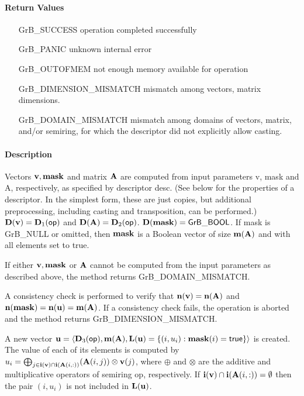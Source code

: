 \paragraph{Return Values}

\begin{itemize}[leftmargin=2.1in]
\item[{\sf GrB\_SUCCESS}]             operation completed successfully
\item[{\sf GrB\_PANIC}]               unknown internal error
\item[{\sf GrB\_OUTOFMEM}]            not enough memory available for operation
\item[{\sf GrB\_DIMENSION\_MISMATCH}] mismatch among vectors, matrix dimensions.
\item[{\sf GrB\_DOMAIN\_MISMATCH}]    mismatch among domains of vectors, matrix, and/or semiring, for which the descriptor did not explicitly allow casting.
\end{itemize}


\paragraph{Description}

Vectors ${\bf v}, {\bf mask}$ and matrix ${\bf A}$ are computed from
input parameters {\sf v}, {\sf mask} and {\sf A}, respectively, as specified
by descriptor {\sf desc}. (See below for the properties of a descriptor. In
the simplest form, these are just copies, but additional preprocessing,
including casting and transposition, can be performed.)  $\bold{D}({\bf v}) =
\bold{D}_1({\sf op})$ and $\bold{D}({\bf A}) = \bold{D}_2({\sf op})$.
$\bold{D}({\bf mask}) = {\sf GrB\_BOOL}$.  If {\sf mask} is {\sf GrB\_NULL} or omitted,
then ${\bf mask}$ is a Boolean vector of size $\bold{m}({\bf A})$
and with all elements set to {\sf true}.

If either ${\bf v}, {\bf mask}$ or ${\bf A}$ cannot be computed
from the input parameters as described above, the method returns {\sf
GrB\_DOMAIN\_MISMATCH}.

A consistency check is performed to verify that $\bold{n}({\bf v})
= \bold{n}({\bf A})$ and $\bold{n}({\bf mask}) =
\bold{n}({\bf u}) = \bold{m}({\bf A})$. If a consistency check fails, the operation is
aborted and the method returns {\sf GrB\_DIMENSION\_MISMATCH}.

A new vector ${\bf u} = \langle \bold{D}_3({\sf op}),
\bold{m}({\bf A}), \bold{L}({\bf u}) = \{(i,u_i) : {\bf mask}(i)
= {\sf true} \} \rangle$ is created.  The value of each of its elements
is computed by $u_i = \bigoplus_{j \in {\bf i}({\bf v}) \cap
{\bf i}({\bf A}(i,:))} ({\bf A}(i,j)) \otimes {\bf v}(j)$,
where $\oplus$ and $\otimes$ are the additive and multiplicative
operators of semiring {\sf op}, respectively.  If ${\bf i}({\bf v})
\cap {\bf i}({\bf A}(i,:)) = \emptyset$ then the pair $(i,u_i)$
is not included in $\bold{L}({\bf u})$.

